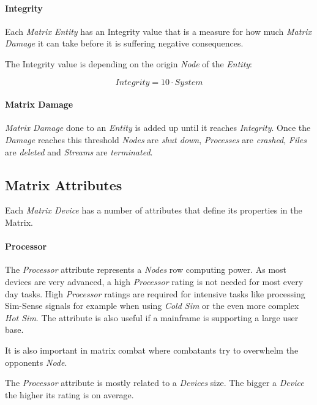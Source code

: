 \paragraph{Integrity}

Each \emph{Matrix Entity} has an Integrity value that is a measure for how much
\emph{Matrix Damage} it can take before it is suffering negative consequences.

The Integrity value is depending on the origin \emph{Node} of the \emph{Entity}:

\begin{equation}
    \textit{Integrity} = 10 \cdot \textit{System}
\end{equation}

\paragraph{Matrix Damage}
\emph{Matrix Damage} done to an \emph{Entity} is added up until it reaches
\emph{Integrity}.  Once the \emph{Damage} reaches this threshold
\emph{Nodes} are \emph{shut down},  \emph{Processes} are \emph{crashed},
\emph{Files} are \emph{deleted} and \emph{Streams} are \emph{terminated}.

\subsection{Matrix Attributes}

Each \emph{Matrix Device} has a number of attributes that define its properties
in the Matrix.

\paragraph{Processor}

The \emph{Processor} attribute represents a \emph{Nodes} row computing power. As most
devices are very advanced, a high \emph{Processor} rating is not needed for most every
day tasks. High \emph{Processor} ratings are required for intensive tasks like processing
Sim-Sense signals for example when using \emph{Cold Sim} or the even more complex
\emph{Hot Sim}. The attribute is also useful if a mainframe is supporting a large
user base.

It is also important in matrix combat where combatants try to overwhelm
the opponents \emph{Node}.

\hfill

The \emph{Processor} attribute is mostly related to a \emph{Devices} size. The
bigger a \emph{Device} the higher its rating is on average.

